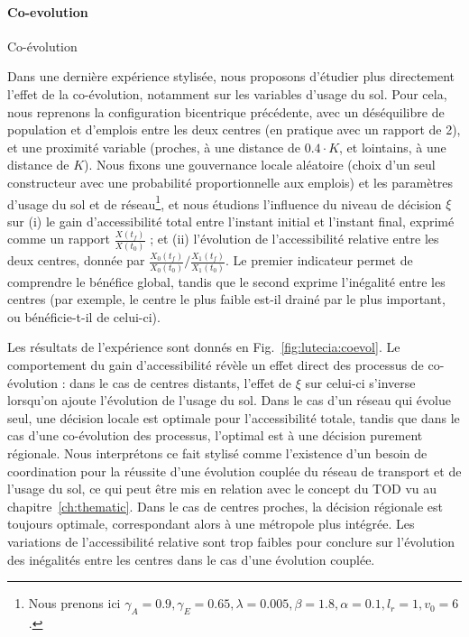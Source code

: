 \paragraph{Co-evolution}{Co-évolution}

Dans une dernière expérience stylisée, nous proposons d'étudier plus directement l'effet de la co-évolution, notamment sur les variables d'usage du sol. Pour cela, nous reprenons la configuration bicentrique précédente, avec un déséquilibre de population et d'emplois entre les deux centres (en pratique avec un rapport de 2), et une proximité variable (proches, à une distance de $0.4\cdot K$, et lointains, à une distance de $K$). Nous fixons une gouvernance locale aléatoire (choix d'un seul constructeur avec une probabilité proportionnelle aux emplois) et les paramètres d'usage du sol et de réseau\footnote{Nous prenons ici $\gamma_A = 0.9, \gamma_E = 0.65, \lambda = 0.005, \beta = 1.8, \alpha = 0.1, l_r = 1, v_0 = 6$.}, et nous étudions l'influence du niveau de décision $\xi$ sur (i) le gain d'accessibilité total entre l'instant initial et l'instant final, exprimé comme un rapport $\frac{X(t_f)}{X(t_0)}$ ; et (ii) l'évolution de l'accessibilité relative entre les deux centres, donnée par $\frac{X_0(t_f)}{X_0(t_0)} / \frac{X_1(t_f)}{X_1(t_0)}$. Le premier indicateur permet de comprendre le bénéfice global, tandis que le second exprime l'inégalité entre les centres (par exemple, le centre le plus faible est-il drainé par le plus important, ou bénéficie-t-il de celui-ci).

Les résultats de l'expérience sont donnés en Fig.~\ref{fig:lutecia:coevol}. Le comportement du gain d'accessibilité révèle un effet direct des processus de co-évolution : dans le cas de centres distants, l'effet de $\xi$ sur celui-ci s'inverse lorsqu'on ajoute l'évolution de l'usage du sol. Dans le cas d'un réseau qui évolue seul, une décision locale est optimale pour l'accessibilité totale, tandis que dans le cas d'une co-évolution des processus, l'optimal est à une décision purement régionale. Nous interprétons ce fait stylisé comme l'existence d'un besoin de coordination pour la réussite d'une évolution couplée du réseau de transport et de l'usage du sol, ce qui peut être mis en relation avec le concept du TOD vu au chapitre~\ref{ch:thematic}. Dans le cas de centres proches, la décision régionale est toujours optimale, correspondant alors à une métropole plus intégrée. Les variations de l'accessibilité relative sont trop faibles pour conclure sur l'évolution des inégalités entre les centres dans le cas d'une évolution couplée.


